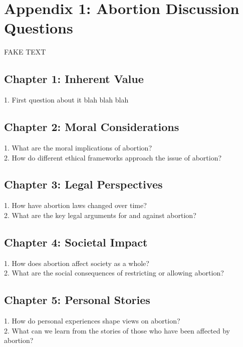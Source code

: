 \chapter{Appendix 1: Abortion Discussion Questions}


FAKE TEXT
\section{Chapter 1: Inherent Value}
1. First question about it blah blah blah\\

\section{Chapter 2: Moral Considerations}
1. What are the moral implications of abortion?\\
2. How do different ethical frameworks approach the issue of abortion?\\

\section{Chapter 3: Legal Perspectives}
1. How have abortion laws changed over time?\\
2. What are the key legal arguments for and against abortion?\\

\section{Chapter 4: Societal Impact}
1. How does abortion affect society as a whole?\\
2. What are the social consequences of restricting or allowing abortion?\\

\section{Chapter 5: Personal Stories}

1. How do personal experiences shape views on abortion?\\
2. What can we learn from the stories of those who have been affected by abortion?\\